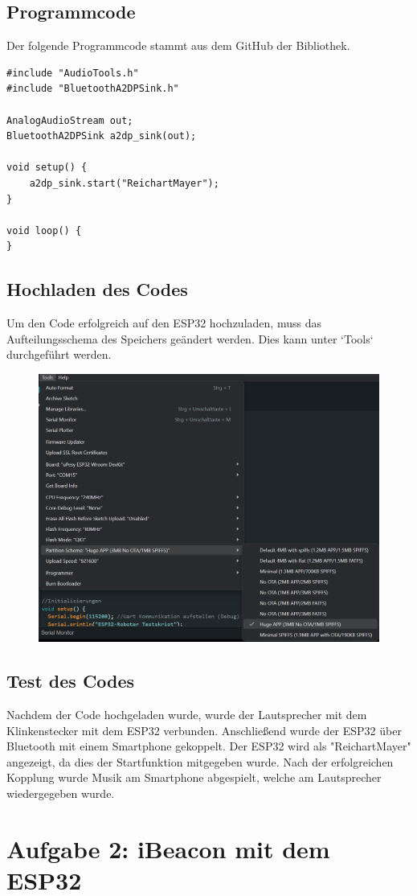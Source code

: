 \documentclass[twoside]{article}
\begin{document}
\subsection{Programmcode}
Der folgende Programmcode stammt aus dem GitHub der Bibliothek.

\begin{verbatim}
#include "AudioTools.h"
#include "BluetoothA2DPSink.h"

AnalogAudioStream out;
BluetoothA2DPSink a2dp_sink(out);

void setup() {
    a2dp_sink.start("ReichartMayer");
}

void loop() {
}
\end{verbatim}

\subsection{Hochladen des Codes}
Um den Code erfolgreich auf den ESP32 hochzuladen, muss das Aufteilungsschema des Speichers geändert werden. Dies kann unter `Tools` durchgeführt werden.
\begin{figure}[h]
    \centering
    \includegraphics[width=0.55\linewidth]{img/Arduino_IDE_02.png}
\end{figure}

\subsection{Test des Codes}
Nachdem der Code hochgeladen wurde, wurde der Lautsprecher mit dem Klinkenstecker mit dem ESP32 verbunden. Anschließend wurde der ESP32 über Bluetooth mit einem Smartphone gekoppelt. Der ESP32 wird als "ReichartMayer" angezeigt, da dies der Startfunktion mitgegeben wurde. Nach der erfolgreichen Kopplung wurde Musik am Smartphone abgespielt, welche am Lautsprecher wiedergegeben wurde.

\newpage
\section{Aufgabe 2: iBeacon mit dem ESP32}
\end{document}
